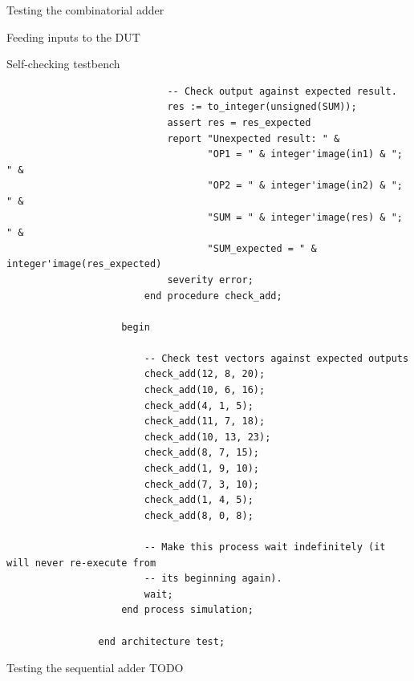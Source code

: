 \documentclass[a4paper, 12pt, onecolumn]{article}
\begin{document}
\begin{section}{Testing the combinatorial adder}
\begin{subsection}{Feeding inputs to the DUT}
\begin{subsubsection}{Self-checking testbench}
\begin{verbatim}
                            -- Check output against expected result.
                            res := to_integer(unsigned(SUM));
                            assert res = res_expected
                            report "Unexpected result: " &
                                   "OP1 = " & integer'image(in1) & "; " &
                                   "OP2 = " & integer'image(in2) & "; " &
                                   "SUM = " & integer'image(res) & "; " &
                                   "SUM_expected = " & integer'image(res_expected)
                            severity error;
                        end procedure check_add;

                    begin

                        -- Check test vectors against expected outputs
                        check_add(12, 8, 20);
                        check_add(10, 6, 16);
                        check_add(4, 1, 5);
                        check_add(11, 7, 18);
                        check_add(10, 13, 23);
                        check_add(8, 7, 15);
                        check_add(1, 9, 10);
                        check_add(7, 3, 10);
                        check_add(1, 4, 5);
                        check_add(8, 0, 8);

                        -- Make this process wait indefinitely (it will never re-execute from
                        -- its beginning again).
                        wait;
                    end process simulation;

                end architecture test;
            \end{verbatim}
            \vspace{-1em}
        \end{subsubsection}
    \end{subsection}
\end{section}

\clearpage

\begin{section}{Testing the sequential adder}
TODO
\end{section}
\end{document}
